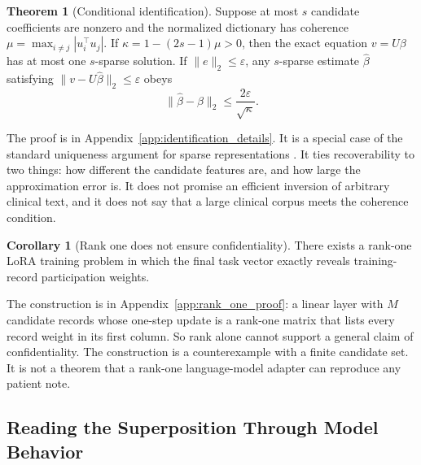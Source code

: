 \documentclass[11pt]{article}
\theoremstyle{plain}
\theoremstyle{definition}
\newtheorem{theorem}{Theorem}
\newtheorem{corollary}{Corollary}
\begin{document}
\begin{theorem}[Conditional identification]
\label{thm:identifiability}
Suppose at most $s$ candidate coefficients are nonzero and the normalized dictionary has coherence
$\mu=\max_{i\ne j}|u_i^\top u_j|$.
If $\kappa=1-(2s-1)\mu>0$, then the exact equation $v=U\beta$ has at most one $s$-sparse solution.
If $\|e\|_2\leq\varepsilon$, any $s$-sparse estimate $\widehat\beta$ satisfying $\|v-U\widehat\beta\|_2\leq\varepsilon$ obeys
\begin{equation}
\|\widehat\beta-\beta\|_2
\leq\frac{2\varepsilon}{\sqrt\kappa}.
\label{eq:recovery_stability}
\end{equation}
\end{theorem}
The proof is in Appendix~\ref{app:identification_details}. It is a special case of the standard uniqueness argument for sparse representations \citep{donoho2003optimally}.
It ties recoverability to two things: how different the candidate features are, and how large the approximation error is.
It does not promise an efficient inversion of arbitrary clinical text, and it does not say that a large clinical corpus meets the coherence condition.

\begin{corollary}[Rank one does not ensure confidentiality]
\label{cor:rank_one}
There exists a rank-one LoRA training problem in which the final task vector exactly reveals training-record participation weights.
\end{corollary}
The construction is in Appendix~\ref{app:rank_one_proof}: a linear layer with $M$ candidate records whose one-step update is a rank-one matrix that lists every record weight in its first column.
So rank alone cannot support a general claim of confidentiality.
The construction is a counterexample with a finite candidate set. It is not a theorem that a rank-one language-model adapter can reproduce any patient note.

\subsection{Reading the Superposition Through Model Behavior}
\label{sec:kernel_readout}
\end{document}
